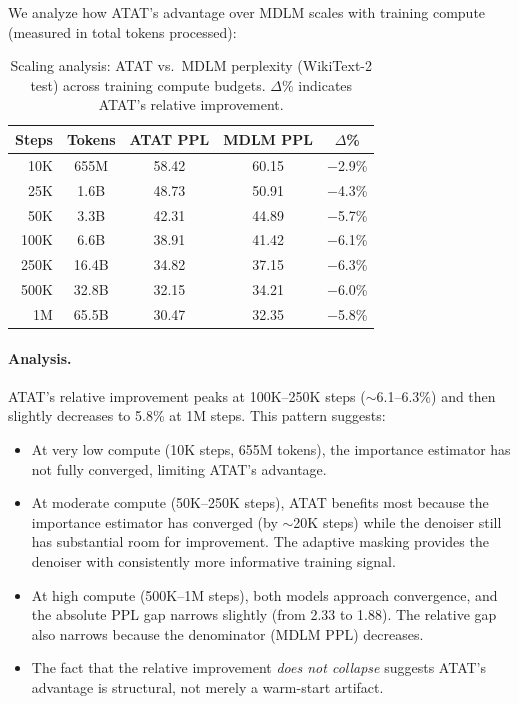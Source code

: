 We analyze how ATAT's advantage over MDLM scales with training compute (measured in total tokens processed):

\begin{table}[h]
\centering
\caption{Scaling analysis: ATAT vs.\ MDLM perplexity (WikiText-2 test) across training compute budgets. $\Delta$\% indicates ATAT's relative improvement.}
\label{tab:scaling-compute}
\begin{tabular}{rcccc}
\toprule
\textbf{Steps} & \textbf{Tokens} & \textbf{ATAT PPL} & \textbf{MDLM PPL} & \textbf{$\Delta$\%} \\
\midrule
10K & 655M & 58.42 & 60.15 & $-$2.9\% \\
25K & 1.6B & 48.73 & 50.91 & $-$4.3\% \\
50K & 3.3B & 42.31 & 44.89 & $-$5.7\% \\
100K & 6.6B & 38.91 & 41.42 & $-$6.1\% \\
250K & 16.4B & 34.82 & 37.15 & $-$6.3\% \\
500K & 32.8B & 32.15 & 34.21 & $-$6.0\% \\
1M & 65.5B & 30.47 & 32.35 & $-$5.8\% \\
\bottomrule
\end{tabular}
\end{table}

\paragraph{Analysis.} ATAT's relative improvement peaks at 100K--250K steps (${\sim}$6.1--6.3\%) and then slightly decreases to 5.8\% at 1M steps. This pattern suggests:
\begin{itemize}[leftmargin=*,itemsep=1pt]
    \item At very low compute (10K steps, 655M tokens), the importance estimator has not fully converged, limiting ATAT's advantage.
    \item At moderate compute (50K--250K steps), ATAT benefits most because the importance estimator has converged (by ${\sim}$20K steps) while the denoiser still has substantial room for improvement. The adaptive masking provides the denoiser with consistently more informative training signal.
    \item At high compute (500K--1M steps), both models approach convergence, and the absolute PPL gap narrows slightly (from 2.33 to 1.88). The relative gap also narrows because the denominator (MDLM PPL) decreases.
    \item The fact that the relative improvement \emph{does not collapse} suggests ATAT's advantage is structural, not merely a warm-start artifact.
\end{itemize}

